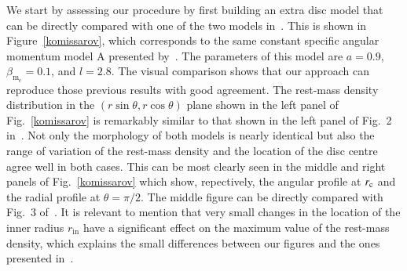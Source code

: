 \documentclass[referee]{aa}
\begin{document}
We start by assessing our procedure by first building an extra disc model that can be directly compared with one of the two models in~\citet{Komissarov:2006}. This is shown in Figure~\ref{komissarov}, which corresponds to the same constant specific angular momentum model A presented by~\citet{Komissarov:2006}. The parameters of this model are $a=0.9$, $\beta_{\mathrm{m}_{\mathrm{c}}}=0.1$, and $l=2.8$.
The visual comparison shows that our approach can reproduce those previous results with good agreement. The rest-mass density distribution in the $(r\sin\theta,r\cos\theta)$ plane shown in the left panel of Fig.~\ref{komissarov} is remarkably similar to that shown in the left panel of Fig.~2 in~\citet{Komissarov:2006}. Not only the morphology of both models is nearly identical but also the range of variation of the rest-mass density and the location of the disc centre agree well in both cases. This can be most clearly seen in the middle and right panels of Fig.~\ref{komissarov} which show, repectively, the angular profile at $r_{\rm c}$ and the radial profile at $\theta=\pi/2$. The middle figure can be directly compared with Fig.~3 of~\citet{Komissarov:2006}. It is relevant to mention that very small changes in the location of the inner radius $r_{\mathrm{in}}$ have a significant effect on the maximum value of the rest-mass density, which explains the small differences between our figures and the ones presented in~\citet{Komissarov:2006}.
\end{document}
